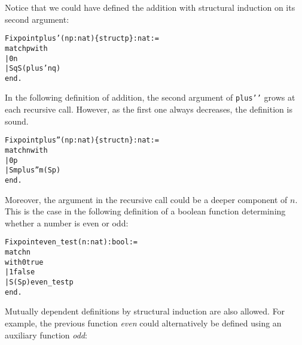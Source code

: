 \documentclass[11pt]{article}
\begin{document}
Notice that we could have defined the addition with structural induction
on its second argument:
\begin{alltt}
Fixpoint plus' (n p:nat) \{struct p\} : nat :=
    match p with
          | 0 {\funarrow} n
          | S q {\funarrow} S (plus' n q)
    end.
\end{alltt}




In the following definition of addition,
the second argument of {\tt plus{'}{'}} grows at each
recursive call. However, as the first one always decreases, the
definition is sound.
\begin{alltt}
Fixpoint plus'' (n p:nat) \{struct n\} : nat :=
 match n with
          | 0 {\funarrow} p
          | S m {\funarrow} plus'' m (S p)
 end.
\end{alltt}

 Moreover, the argument in the recursive call
could be a deeper component of $n$.  This is the case in the following
definition of a boolean function determining whether a number is even
or odd:

\begin{alltt}
Fixpoint even_test (n:nat) : bool :=
  match n
  with 0 {\funarrow}  true
     | 1 {\funarrow}  false
     | S (S p) {\funarrow} even_test p
  end.
\end{alltt}

Mutually dependent definitions by structural induction are also
allowed. For example, the previous function \textsl{even} could alternatively
be defined using an auxiliary function \textsl{odd}:
\end{document}
